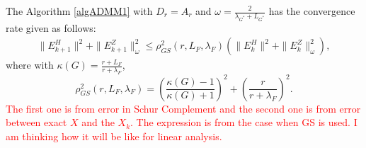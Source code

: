 \begin{itemize}
\begin{theorem}\label{thm:GS}
The Algorithm \ref{algADMM1} with $D_r = A_r$ and $\omega = \frac{2}{\lambda_{G^*} + L_{G^*}}$ has the convergence rate given as follows: 
\begin{eqnarray}\label{gsrate}
\|E_{k+1}^H\|^2 + \|E_{k+1}^Z\|^2_{\omega} \leq \rho^2_{GS}(r,L_F,\lambda_F) \left ( \|E_{k}^H\|^2 + \|E_{k}^Z\|^2_{\omega}  \right ), 
\end{eqnarray}
where with $\kappa(G) = \frac{r+L_F}{r + \lambda_F}$, 
\begin{equation} 
\rho^2_{GS}(r,L_F,\lambda_F) =  \left ( \frac{\kappa(G) - 1}{\kappa(G) + 1} \right )^2 + \left ( \frac{r}{r+\lambda_F} \right )^2. 
\end{equation} 
\textcolor{red}{The first one is from error in Schur Complement and the second one is from error between exact $X$ and the $X_k$. The expression is from the case when GS is used. I am thinking how it will be like for linear analysis.}



\end{theorem}
\end{itemize}
